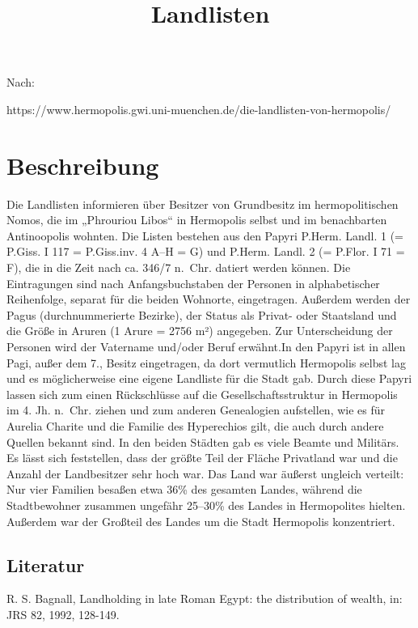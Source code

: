 \documentclass[
]{article}
\title{Landlisten}
\author{}
\date{\vspace{-2.5em}}
\begin{document}
\maketitle

Nach:

https://www.hermopolis.gwi.uni-muenchen.de/die-landlisten-von-hermopolis/

\section{Beschreibung}\label{beschreibung}

Die Landlisten informieren über Besitzer von Grundbesitz im
hermopolitischen Nomos, die im „Phrouriou Libos`` in Hermopolis selbst
und im benachbarten Antinoopolis wohnten. Die Listen bestehen aus den
Papyri P.Herm. Landl. 1 (= P.Giss. I 117 = P.Giss.inv. 4 A--H = G) und
P.Herm. Landl. 2 (= P.Flor. I 71 = F), die in die Zeit nach ca. 346/7
n.~Chr. datiert werden können. Die Eintragungen sind nach
Anfangsbuchstaben der Personen in alphabetischer Reihenfolge, separat
für die beiden Wohnorte, eingetragen. Außerdem werden der Pagus
(durchnummerierte Bezirke), der Status als Privat- oder Staatsland und
die Größe in Aruren (1 Arure = 2756 m²) angegeben. Zur Unterscheidung
der Personen wird der Vatername und/oder Beruf erwähnt.In den Papyri ist
in allen Pagi, außer dem 7., Besitz eingetragen, da dort vermutlich
Hermopolis selbst lag und es möglicherweise eine eigene Landliste für
die Stadt gab. Durch diese Papyri lassen sich zum einen Rückschlüsse auf
die Gesellschaftsstruktur in Hermopolis im 4. Jh. n.~Chr. ziehen und zum
anderen Genealogien aufstellen, wie es für Aurelia Charite und die
Familie des Hyperechios gilt, die auch durch andere Quellen bekannt
sind. In den beiden Städten gab es viele Beamte und Militärs. Es lässt
sich feststellen, dass der größte Teil der Fläche Privatland war und die
Anzahl der Landbesitzer sehr hoch war. Das Land war äußerst ungleich
verteilt: Nur vier Familien besaßen etwa 36\% des gesamten Landes,
während die Stadtbewohner zusammen ungefähr 25--30\% des Landes in
Hermopolites hielten. Außerdem war der Großteil des Landes um die Stadt
Hermopolis konzentriert.

\subsection{Literatur}\label{literatur}

R. S. Bagnall, Landholding in late Roman Egypt: the distribution of
wealth, in: JRS 82, 1992, 128-149.
\end{document}
